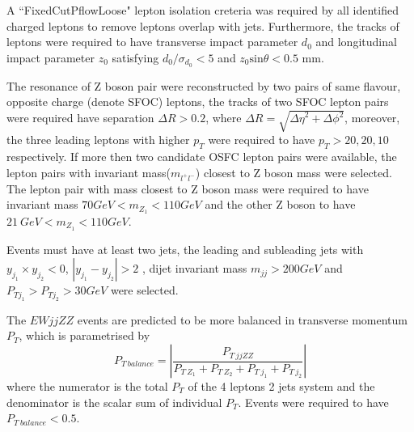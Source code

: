 \documentclass[12pt]{article}
\begin{document}
        \par A ``FixedCutPflowLoose" lepton isolation creteria\cite{Aaboud_2019} was required by all identified charged 
        leptons to remove leptons overlap with jets. Furthermore, the tracks of leptons were required to have transverse 
        impact parameter $d_0$ and longitudinal impact parameter $z_0$ satisfying $d_0/\sigma_{d_0} < \text{5}$ and $z_0\text{sin}\theta < 0.5 \text{\ mm}$.
        \par The resonance of Z boson pair were reconstructed by two pairs of same flavour, opposite charge (denote SFOC) leptons, 
        the tracks of two SFOC lepton pairs were required have separation $\Delta R > 0.2$, where $\Delta R = \sqrt{{\Delta\eta}^2 + {\Delta\phi}^2}$, 
        moreover, the three leading leptons with higher $p_T$ were required to have $p_T > 20, 20, 10$ respectively. 
        If more then two candidate OSFC lepton pairs were available, the lepton pairs with invariant mass($m_{l^+l^-}$) 
        closest to Z boson mass were selected. The lepton pair with mass closest to Z boson mass were required to have 
        invariant mass $70GeV < m_{Z_1} < 110GeV$ and the other Z boson to have $21\ GeV < m_{Z_1} < 110GeV$.
        \par Events must have at least two jets, the leading and subleading jets with $y_{j_1} \times y_{j_2} < 0$, $|y_{j_1} - y_{j_2}| > 2$ 
        , dijet invariant mass $m_{jj} > 200 GeV$ and $P_{Tj_1} > P_{Tj_2}> 30 GeV$ were selected. 

        \par The $EW jjZZ$ events are predicted to be more balanced in transverse momentum $P_T$, which is parametrised by 
        $$P_{T\ balance} = |\frac{P_{T\ jjZZ}}{P_{T\ Z_1} +  P_{T\ Z_2} +  P_{T\ j_1} +  P_{T\ j_2}}|$$ 
        where the numerator is the total $P_T$ of the 4 leptons 2 jets system and the denominator is the 
        scalar sum of individual $P_T$. Events were required to have $P_{T\ balance} < 0.5$.
\end{document}
